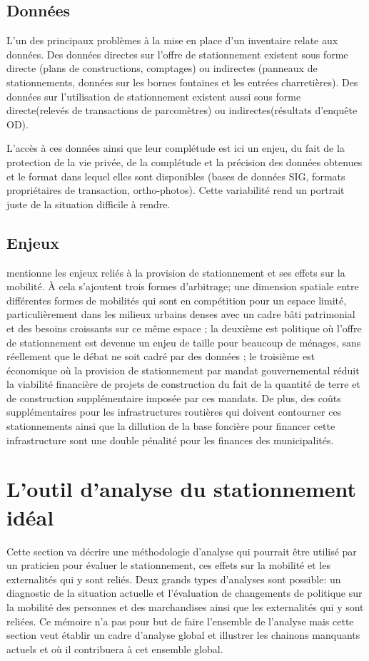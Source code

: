 \subsection{Données}

L'un des principaux problèmes à la mise en place d'un inventaire relate aux données. Des données directes sur l'offre de stationnement existent sous forme directe (plans de constructions, comptages) ou indirectes (panneaux de stationnements, données sur les bornes fontaines et les entrées charretières). Des données sur l'utilisation de stationnement existent aussi sous forme directe(relevés de transactions de parcomètres) ou indirectes(résultats d'enquête OD).\par
L'accès à ces données ainsi que leur complétude est ici un enjeu, du fait de la protection de la vie privée, de la complétude et la précision des données obtenues et le format dans lequel elles sont disponibles (bases de données SIG, formats propriétaires de transaction, ortho-photos). Cette variabilité rend un portrait juste de la situation difficile à rendre.

\subsection{Enjeux}

\textcite{Bourdeau:MethodologieAnalyse:2014} mentionne les enjeux reliés à la provision de stationnement et ses effets sur la mobilité. À cela s'ajoutent trois formes d'arbitrage; une dimension spatiale entre différentes formes de mobilités qui sont en compétition pour un espace limité, particulièrement dans les milieux urbains denses avec un cadre bâti patrimonial et des besoins croissants sur ce même espace ; la deuxième est politique où l'offre de stationnement est devenue un enjeu de taille pour beaucoup de ménages, sans réellement que le débat ne soit cadré par des données ; le troisième est économique où la provision de stationnement par mandat gouvernemental réduit la viabilité financière de projets de construction du fait de la quantité de terre et de construction supplémentaire imposée par ces mandats. De plus, des coûts supplémentaires pour les infrastructures routières qui doivent contourner ces stationnements  \fg{} ainsi que la dillution de la base foncière pour financer cette infrastructure sont une double pénalité pour les finances des municipalités. 


\section{L'outil d'analyse du stationnement idéal}
Cette section va décrire une méthodologie d'analyse qui pourrait être utilisé par un praticien pour évaluer le stationnement, ces effets sur la mobilité et les externalités qui y sont reliés. Deux grands types d'analyses sont possible: un diagnostic de la situation actuelle et l'évaluation de changements de politique sur la mobilité des personnes et des marchandises ainsi que les externalités qui y sont reliées. Ce mémoire n'a pas pour but de faire l'ensemble de l'analyse mais cette section veut établir un cadre d'analyse global et illustrer les chainons manquants actuels et où il contribuera à cet ensemble global.
